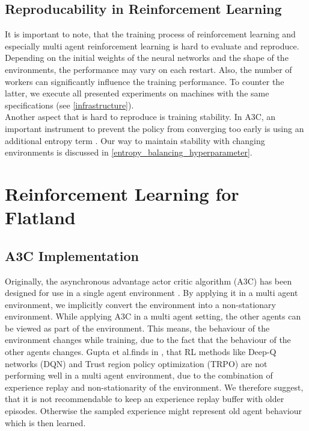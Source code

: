 \subsection*{Reproducability in Reinforcement Learning}\label{enhanced_observations}
It is important to note, that the training process of reinforcement learning and especially multi agent reinforcement learning is hard to evaluate and reproduce. Depending on the initial weights of the neural networks and the shape of the environments, the performance may vary on each restart. Also, the number of workers can 
significantly influence the training performance. To counter the latter, we execute all presented experiments on machines with the same specifications (see \autoref{infrastructure}).\\
Another aspect that is hard to reproduce is training stability. In A3C, an important instrument to prevent the policy from converging too early is using an additional entropy term \cite{a3c}. Our way to maintain stability with changing environments is discussed in \autoref{entropy_balancing_hyperparameter}.

\section{Reinforcement Learning for Flatland}
\subsection*{A3C Implementation}\label{enhanced_observations}
Originally, the asynchronous advantage actor critic algorithm (A3C) has been designed for use in a single agent environment \cite{a3c}.
By applying it in a multi agent environment, we implicitly convert the environment into a non-stationary environment.
While applying A3C in a multi agent setting, the other agents can be viewed as part of the environment. This means, the behaviour of the environment changes while training, due to the fact that the behaviour of the other agents changes.
Gupta et al.finds in \cite{multiagent_comp_a3c_dqn_etc}, that RL methods like Deep-Q networks (DQN) and Trust region policy optimization (TRPO) are not performing well in a multi agent environment, due to the combination of experience replay and non-stationarity of the environment. We therefore suggest, that it is not recommendable to keep an experience replay buffer with older episodes. Otherwise the sampled experience might represent old agent behaviour which is then learned.

